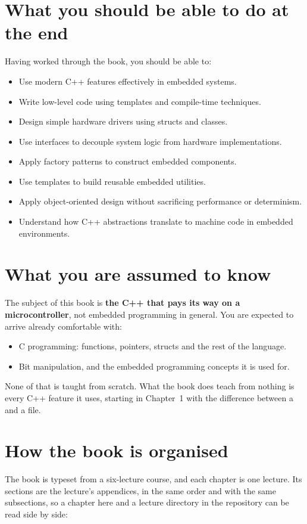 \section*{What you should be able to do at the end}
Having worked through the book, you should be able to:
\begin{itemize}
  \item Use modern C++ features effectively in embedded systems.
  \item Write low-level code using templates and compile-time techniques.
  \item Design simple hardware drivers using structs and classes.
  \item Use interfaces to decouple system logic from hardware implementations.
  \item Apply factory patterns to construct embedded components.
  \item Use templates to build reusable embedded utilities.
  \item Apply object-oriented design without sacrificing performance or determinism.
  \item Understand how C++ abstractions translate to machine code in embedded environments.
\end{itemize}

\section*{What you are assumed to know}
The subject of this book is \textbf{the C++ that pays its way on a microcontroller}, not embedded
programming in general. You are expected to arrive already comfortable with:
\begin{itemize}
  \item C programming: functions, pointers, structs and the rest of the language.
  \item Bit manipulation, and the embedded programming concepts it is used for.
\end{itemize}
None of that is taught from scratch. What the book does teach from nothing is every C++ feature it
uses, starting in Chapter~1 with the difference between a  and a  file.

\section*{How the book is organised}
The book is typeset from a six-lecture course, and each chapter is one lecture. Its sections are
the lecture's appendices, in the same order and with the same subsections, so a chapter here and a
lecture directory in the repository can be read side by side:

